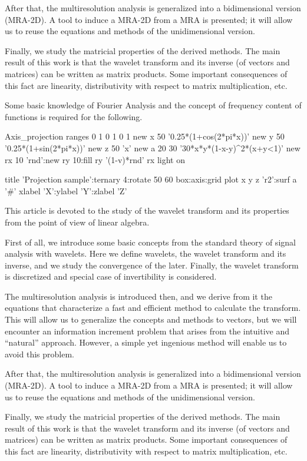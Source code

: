 \documentclass[letterpaper,10pt]{article}
\begin{document}
  After that, the multiresolution analysis is generalized into a bidimensional version (MRA-2D). A tool to induce a MRA-2D from a MRA is presented; it will allow us to reuse the equations and methods of the unidimensional version.
  
  Finally, we study the matricial properties of the derived methods. The main result of this work is that the wavelet transform and its inverse (of vectors and matrices) can be written as matrix products. Some important consequences of this fact are linearity, distributivity with respect to matrix multiplication, etc.
  
  Some basic knowledge of Fourier Analysis and the concept of frequency content of functions is required for the following.
  
  \begin{mglblock}{Axis_projection}
ranges 0 1 0 1 0 1
new x 50 '0.25*(1+cos(2*pi*x))'
new y 50 '0.25*(1+sin(2*pi*x))'
new z 50 'x'
new a 20 30 '30*x*y*(1-x-y)^2*(x+y<1)'
new rx 10 'rnd':new ry 10:fill ry '(1-v)*rnd' rx
light on

title 'Projection sample':ternary 4:rotate 50 60
box:axis:grid
plot x y z 'r2':surf a '#'
xlabel 'X':ylabel 'Y':zlabel 'Z'
  \end{mglblock}
  \noindent This article is devoted to the study of the wavelet transform and its properties from the point of view of linear algebra.
  
  First of all, we introduce some basic concepts from the standard theory of signal analysis with wavelets. Here we define wavelets, the wavelet transform and its inverse, and we study the convergence of the later. Finally, the wavelet transform is discretized and special case of invertibility is considered.
  
  The multiresolution analysis is introduced then, and we derive from it the equations that characterize a fast and efficient method to calculate the transform. This will allow us to generalize the concepts and methods to vectors, but we will encounter an information increment problem that arises from the intuitive and ``natural'' approach. However, a simple yet ingenious method will enable us to avoid this problem.
  
  After that, the multiresolution analysis is generalized into a bidimensional version (MRA-2D). A tool to induce a MRA-2D from a MRA is presented; it will allow us to reuse the equations and methods of the unidimensional version.
  
  Finally, we study the matricial properties of the derived methods. The main result of this work is that the wavelet transform and its inverse (of vectors and matrices) can be written as matrix products. Some important consequences of this fact are linearity, distributivity with respect to matrix multiplication, etc.
  
\end{document}
